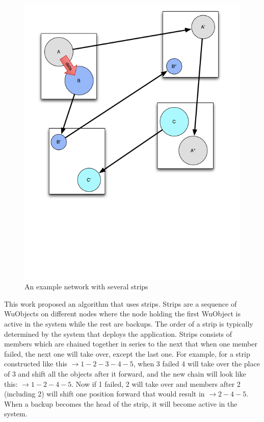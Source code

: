 \begin{figure}[h!]
\caption{An example network with several strips}
\label{fig:strips-network}
\centering
    \includegraphics[width=\linewidth]{figures/strips-network}
\end{figure}

This work proposed an algorithm that uses strips. Strips are a sequence of
WuObjects on different nodes where the node holding the first WuObject is
active in the system while the rest are backups. The order of a strip is
typically determined by the system that deploys the application. Strips
consists of members which are chained together in series to the next that when
one member failed, the next one will take over, except the last one. For
example, for a strip constructed like this $\rightarrow 1-2-3-4-5$, when
3 failed 4 will take over the place of 3 and shift all the objects after it
forward, and the new chain will look like this: $\rightarrow 1-2-4-5$. Now if
1 failed, 2 will take over and members after 2 (including 2) will shift one
position forward that would result in $\rightarrow 2-4-5$. When a backup
becomes the head of the strip, it will become active in the system.

